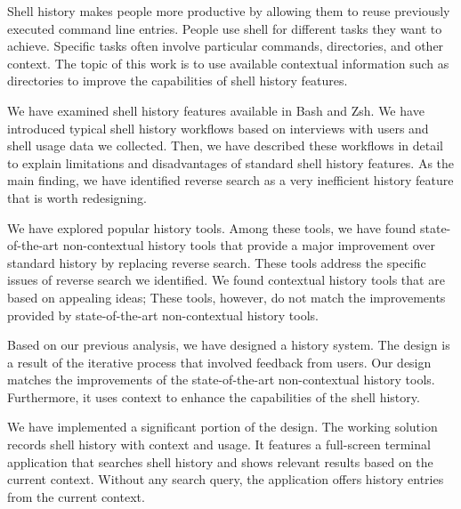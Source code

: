 \documentclass[thesis=M,english]{FITthesis}[2012/10/20]
\begin{document}
\begin{conclusion}

Shell history makes people more productive by allowing them to reuse previously executed command line entries. People use shell for different tasks they want to achieve. Specific tasks often involve particular commands, directories, and other context. The topic of this work is to use available contextual information such as directories to improve the capabilities of shell history features.

We have examined shell history features available in Bash and Zsh. %
We have introduced typical shell history workflows based on interviews with users and shell usage data we collected. Then, we have described these workflows in detail to explain limitations and disadvantages of standard shell history features.
As the main finding, we have identified reverse search as a very inefficient history feature that is worth redesigning.

We have explored popular history tools. Among these tools, we have found state-of-the-art non-contextual history tools that provide a major improvement over standard history by replacing reverse search. These tools address the specific issues of reverse search we identified. We found contextual history tools that are based on appealing ideas; These tools, however, do not match the improvements provided by state-of-the-art non-contextual history tools. %



Based on our previous analysis, we have designed a history system. The design is a result of the iterative process that involved feedback from users. Our design matches the improvements of the state-of-the-art non-contextual history tools. Furthermore, it uses context to enhance the capabilities of the shell history. %


We have implemented a significant portion of the design. The working solution records shell history with context and usage. It features a full-screen terminal application that searches shell history and shows relevant results based on the current context. Without any search query, the application offers history entries from the current context. 


\end{conclusion}
\end{document}
